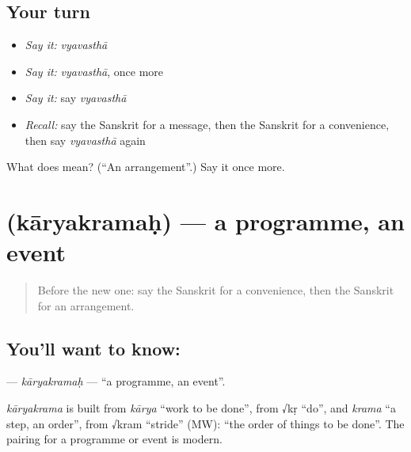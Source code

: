 \subsection*{Your turn}
\begin{itemize}
\raggedright
  \item \emph{Say it:} \emph{vyavasthā}
  \item \emph{Say it:} \emph{vyavasthā}, once more
  \item \emph{Say it:} say \emph{vyavasthā}
  \item \emph{Recall:} say the Sanskrit for a message, then the Sanskrit for a convenience, then say \emph{vyavasthā} again
\end{itemize}

\begin{tcolorbox}[breakable,colback=teal!4,colframe=teal!35!black,title={Before you move on}]
What does  mean? (\textquotedblleft{}An arrangement\textquotedblright{}.) Say it once more.
\end{tcolorbox}
\section[\texorpdfstring{\sk{कार्यक्रमः} (kāryakramaḥ)}{कार्यक्रमः (kāryakramaḥ)}]{ (kāryakramaḥ) — a programme, an event}

\label{lesson:SA-C171-karyakramah}



\begin{quote}
Before the new one: say the Sanskrit for a convenience, then the Sanskrit for an arrangement.
\end{quote}

\subsection*{You'll want to know: }
\textbf{} — \emph{kāryakramaḥ} — \textquotedblleft{}a programme, an event\textquotedblright{}.

\begin{cousinweb}
\emph{kāryakrama} is built from \emph{kārya} \textquotedblleft{}work to be done\textquotedblright{}, from √kṛ \textquotedblleft{}do\textquotedblright{}, and \emph{krama} \textquotedblleft{}a step, an order\textquotedblright{}, from √kram \textquotedblleft{}stride\textquotedblright{} (MW): \textquotedblleft{}the order of things to be done\textquotedblright{}. The pairing for a programme or event is modern.
\end{cousinweb}

